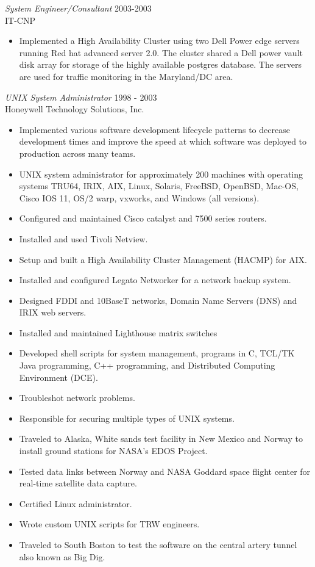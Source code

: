 \documentclass[margin, 10pt]{res} %
\begin{document}
\begin{resume}
{\sl System Engineer/Consultant } \hfill 2003-2003 \\
IT-CNP
\begin{itemize}
\item Implemented a High Availability Cluster using two Dell Power edge servers running Red hat advanced server 2.0.  The cluster shared a Dell power vault disk array for storage of the highly available postgres database. The servers are used for traffic monitoring in the Maryland/DC area.
\end{itemize}

{\sl UNIX System Administrator } \hfill 1998 - 2003 \\
Honeywell Technology Solutions, Inc.
\begin{itemize}
\item Implemented various software development lifecycle patterns to decrease development times and improve the speed at which software was deployed to production across many teams.
\item UNIX system administrator for approximately 200 machines with operating systems TRU64, IRIX, AIX, Linux, Solaris, FreeBSD, OpenBSD, Mac-OS, Cisco IOS 11, OS/2 warp, vxworks, and Windows (all versions).
\item Configured and maintained Cisco catalyst and 7500 series routers.
\item Installed and used Tivoli Netview.
\item Setup and built a High Availability Cluster Management (HACMP) for AIX.
\item Installed and configured Legato Networker for a network backup system.
\item Designed FDDI and 10BaseT networks, Domain Name Servers (DNS) and IRIX web servers.
\item Installed and maintained Lighthouse matrix switches
\item Developed shell scripts for system management, programs in C, TCL/TK Java programming, C++ programming, and Distributed Computing Environment (DCE).
\item Troubleshot network problems.
\item Responsible for securing multiple types of UNIX systems.
\item Traveled to Alaska, White sands test facility in New Mexico and Norway to install ground stations for NASA's EDOS Project.
\item Tested data links between Norway and NASA Goddard space flight center for real-time satellite data capture.
\item Certified Linux administrator.
\item Wrote custom UNIX scripts for TRW engineers.
\item Traveled to South Boston to test the software on the central artery tunnel also known as Big Dig.
\end{itemize}


\end{resume}
\end{document}
